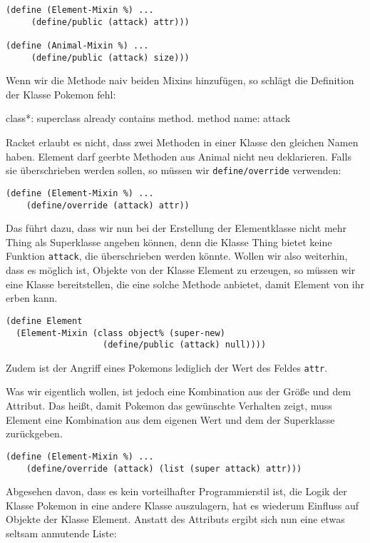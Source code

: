 \begin{lstlisting}
(define (Element-Mixin %) ...
     (define/public (attack) attr)))

(define (Animal-Mixin %) ...
     (define/public (attack) size)))
\end{lstlisting}

Wenn wir die Methode naiv beiden Mixins hinzufügen, so schlägt die Definition der Klasse Pokemon fehl:

{\rerror class*: superclass already contains method. method name: attack}

Racket erlaubt es nicht, dass zwei Methoden in einer Klasse den gleichen Namen haben. Element darf geerbte Methoden aus Animal nicht neu deklarieren. Falls sie überschrieben werden sollen, so müssen wir \texttt{define/override} verwenden:

\begin{lstlisting}
(define (Element-Mixin %) ...
    (define/override (attack) attr))
\end{lstlisting}

Das führt dazu, dass wir nun bei der Erstellung der Elementklasse nicht mehr Thing als Superklasse angeben können, denn die Klasse Thing bietet keine Funktion \texttt{attack}, die überschrieben werden könnte. Wollen wir also weiterhin, dass es möglich ist, Objekte von der Klasse Element zu erzeugen, so müssen wir eine Klasse bereitstellen, die eine solche Methode anbietet, damit Element von ihr erben kann.

\begin{lstlisting}
(define Element 
  (Element-Mixin (class object% (super-new)
                   (define/public (attack) null))))
\end{lstlisting}

Zudem ist der Angriff eines Pokemons lediglich der Wert des Feldes \texttt{attr}. 

Was wir eigentlich wollen, ist jedoch eine Kombination aus der Größe und dem Attribut. Das heißt, damit Pokemon das gewünschte Verhalten zeigt, muss Element eine Kombination aus dem eigenen Wert und dem der Superklasse zurückgeben.

\begin{lstlisting}
(define (Element-Mixin %) ...
    (define/override (attack) (list (super attack) attr)))
\end{lstlisting}

Abgesehen davon, dass es kein vorteilhafter Programmierstil ist, die Logik der Klasse Pokemon in eine andere Klasse auszulagern, hat es wiederum Einfluss auf Objekte der Klasse Element. Anstatt des Attributs ergibt sich nun eine etwas seltsam anmutende Liste:

